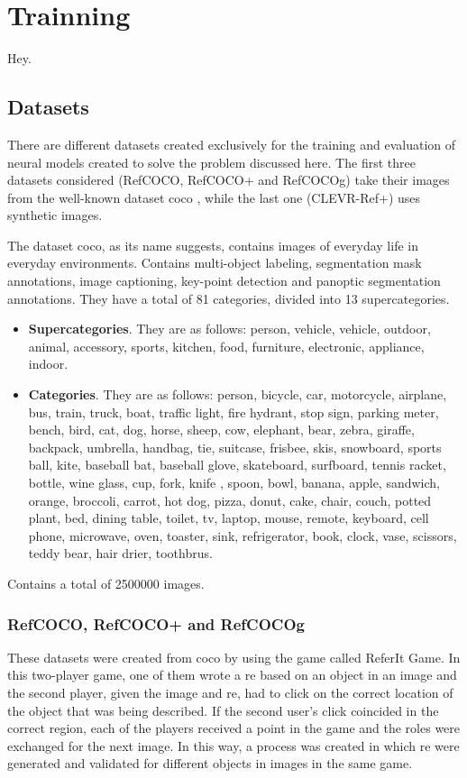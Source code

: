 \section{Trainning}

Hey.

\subsection{Datasets} \label{sec:datasets}

There are different datasets created exclusively for the training and
evaluation of neural models created to solve the problem discussed here. The
first three datasets considered (RefCOCO, RefCOCO+ and RefCOCOg) take their
images from the well-known dataset \gls{coco} \cite{lin14:micros}
, while the last one (CLEVR-Ref+) uses synthetic
images.

The dataset \gls{coco}, as its name suggests, contains images of everyday life
in everyday environments. Contains multi-object labeling, segmentation mask
annotations, image captioning, key-point detection and panoptic segmentation
annotations. They have a total of 81 categories, divided into 13
supercategories.
\begin{itemize}
  \item \textbf{Supercategories}. They are as follows: person, vehicle,
  vehicle, outdoor, animal, accessory, sports, kitchen, food, furniture,
  electronic, appliance, indoor.
  \item \textbf{Categories}. They are as follows: person, bicycle, car,
  motorcycle, airplane, bus, train, truck, boat, traffic light, fire hydrant,
  stop sign, parking meter, bench, bird, cat, dog, horse, sheep, cow, elephant,
  bear, zebra, giraffe, backpack, umbrella, handbag, tie, suitcase, frisbee,
  skis, snowboard, sports ball, kite, baseball bat, baseball glove, skateboard,
  surfboard, tennis racket, bottle, wine glass, cup, fork, knife , spoon, bowl,
  banana, apple, sandwich, orange, broccoli, carrot, hot dog, pizza, donut,
  cake, chair, couch, potted plant, bed, dining table, toilet, tv, laptop,
  mouse, remote, keyboard, cell phone, microwave, oven, toaster, sink,
  refrigerator, book, clock, vase, scissors, teddy bear, hair drier, toothbrus.
\end{itemize}
Contains a total of \num{2500000} images.

\subsubsection{RefCOCO, RefCOCO+ and RefCOCOg}
These datasets were created from \gls{coco} by 
using the game called ReferIt Game. In this two-player game, one of them wrote
a \gls{re} based on an object in an image and the second player, given the
image and \gls{re}, had to click on the correct location of the object that was
being described. If the second user's click coincided in the correct region,
each of the players received a point in the game and the roles were exchanged
for the next image. In this way, a process was created in which \gls{re} were
generated and validated for different objects in images in the same game.

